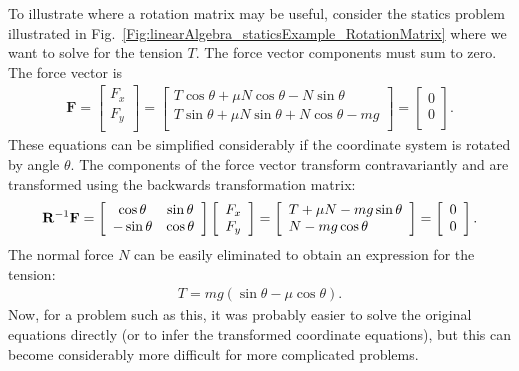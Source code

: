 To illustrate where a rotation matrix may be useful, consider the statics problem illustrated in Fig.~\ref{Fig:linearAlgebra_staticsExample_RotationMatrix} where we want to solve for the tension $T$. The force vector components must sum to zero. The force vector is
\begin{align}
  \mathbf{F} = \left[ \begin{array}{c} F_x \\ F_y \\ \end{array} \right] 
  = \left[ \begin{array}{l} T \cos\theta + \mu N \cos\theta - N \sin\theta \\ T \sin\theta + \mu N \sin\theta + N \cos \theta - mg \\ \end{array} \right]
  = \left[ \begin{array}{c} 0 \\ 0  \\ \end{array} \right] . \nonumber
\end{align}
These equations can be simplified considerably if the coordinate system is rotated by angle $\theta$. The components of the force vector transform contravariantly and are transformed using the backwards transformation matrix:
\begin{align}
  \mathbf{R}^{-1} \mathbf{F} = \left[ \begin{array}{c c} \cos \theta & \sin \theta \\ -\sin \theta & \cos \theta \\ \end{array} \right] \left[ \begin{array}{c} F_x \\ F_y \\ \end{array} \right] 
  = \left[ \begin{array}{l} T + \mu N - mg \sin\theta \\ N - mg \cos \theta  \\ \end{array} \right]
  = \left[ \begin{array}{c} 0 \\ 0  \\ \end{array} \right] . \nonumber
\end{align}
The normal force $N$ can be easily eliminated to obtain an expression for the tension:
\begin{align}
  T = mg ( \sin\theta - \mu \cos\theta ) . \nonumber
\end{align}
Now, for a problem such as this, it was probably easier to solve the original equations directly (or to infer the transformed coordinate equations), but this can become considerably more difficult for more complicated problems.


